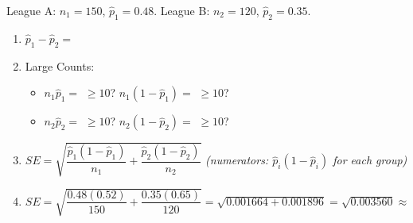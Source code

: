 \documentclass[10pt]{article}
\begin{document}
\namedateperiod

\vspace{0.15in}

League A: $n_1=150$, $\hat p_1=0.48$. League B: $n_2=120$, $\hat p_2=0.35$.

\begin{enumerate}
  \item $\hat p_1 - \hat p_2 = $ 

  \item Large Counts:
        \begin{itemize}
          \item $n_1\hat p_1 = $  $\ge10$?  \quad $n_1(1-\hat p_1) = $  $\ge10$? 
          \item $n_2\hat p_2 = $  $\ge10$?  \quad $n_2(1-\hat p_2) = $  $\ge10$? 
        \end{itemize}

  \item $SE = \sqrt{\dfrac{\hat p_1(1-\hat p_1)}{n_1} + \dfrac{\hat p_2(1-\hat p_2)}{n_2}}$ \quad \textit{(numerators: $\hat p_i(1-\hat p_i)$ for each group)}

  \item $SE = \sqrt{\dfrac{0.48(0.52)}{150} + \dfrac{0.35(0.65)}{120}} = \sqrt{0.001664 + 0.001896} = \sqrt{0.003560} \approx$ 
\end{enumerate}
\end{document}

